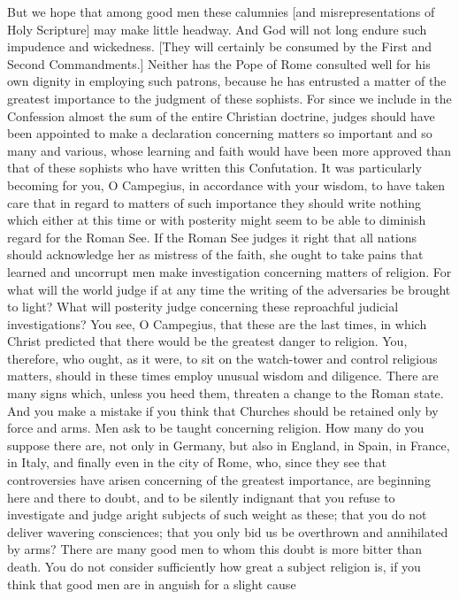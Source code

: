 But we hope that among good men these calumnies [and
misrepresentations of Holy Scripture] may make little headway.  And
God will not long endure such impudence and wickedness.  [They will
certainly be consumed by the First and Second Commandments.] Neither
has the Pope of Rome consulted well for his own dignity in employing
such patrons, because he has entrusted a matter of the greatest
importance to the judgment of these sophists.  For since we include
in the Confession almost the sum of the entire Christian doctrine,
judges should have been appointed to make a declaration concerning
matters so important and so many and various, whose learning and
faith would have been more approved than that of these sophists who
have written this Confutation.  It was particularly becoming for you,
O Campegius, in accordance with your wisdom, to have taken care that
in regard to matters of such importance they should write nothing
which either at this time or with posterity might seem to be able to
diminish regard for the Roman See.  If the Roman See judges it right
that all nations should acknowledge her as mistress of the faith, she
ought to take pains that learned and uncorrupt men make investigation
concerning matters of religion.  For what will the world judge if at
any time the writing of the adversaries be brought to light?  What
will posterity judge concerning these reproachful judicial
investigations?  You see, O Campegius, that these are the last times,
in which Christ predicted that there would be the greatest danger to
religion.  You, therefore, who ought, as it were, to sit on the
watch-tower and control religious matters, should in these times
employ unusual wisdom and diligence.  There are many signs which,
unless you heed them, threaten a change to the Roman state.  And you
make a mistake if you think that Churches should be retained only by
force and arms.  Men ask to be taught concerning religion.  How many
do you suppose there are, not only in Germany, but also in England,
in Spain, in France, in Italy, and finally even in the city of Rome,
who, since they see that controversies have arisen concerning of the
greatest importance, are beginning here and there to doubt, and to be
silently indignant that you refuse to investigate and judge aright
subjects of such weight as these; that you do not deliver wavering
consciences; that you only bid us be overthrown and annihilated by
arms?  There are many good men to whom this doubt is more bitter than
death.  You do not consider sufficiently how great a subject religion
is, if you think that good men are in anguish for a slight cause
